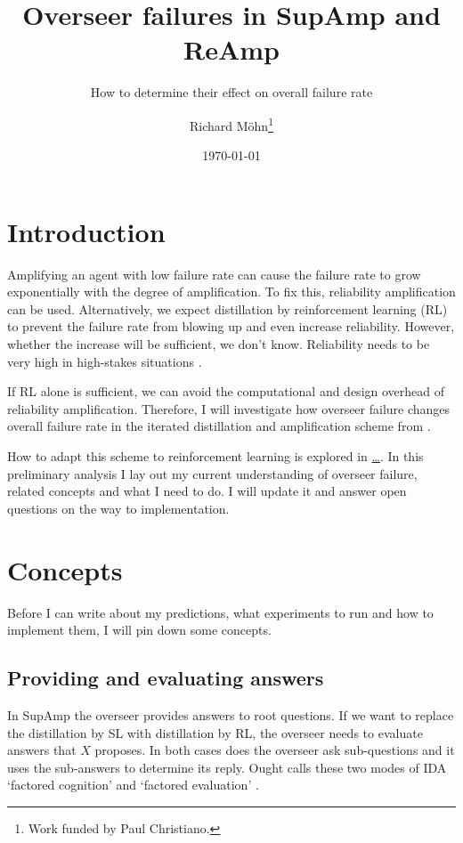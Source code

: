 \documentclass{farlamp}
\title{Overseer failures in SupAmp and ReAmp}
\subtitle{How to determine their effect on overall failure rate}
\author{Richard Möhn\thanks{Work funded by Paul Christiano.}}
\date{\today}
\begin{document}
\maketitle
\tableofcontents

\section{Introduction}

Amplifying an agent with low failure rate can cause the failure rate to grow
exponentially with the degree of amplification. To fix this, reliability
amplification can be used. Alternatively, we expect distillation by
reinforcement learning (RL) to prevent the failure rate from blowing up and even
increase reliability.
However, whether the increase will be sufficient, we don't know.
\parencite{ChriRelAmp} Reliability needs to be very high in high-stakes
situations \parencite[see][]{ChriLearCata}.

If RL alone is sufficient, we can avoid the computational and design overhead of
reliability amplification. Therefore, I will investigate how overseer failure
changes overall failure rate in the iterated distillation and amplification
scheme from \textcite{CSASupAmp}.

How to adapt this scheme to reinforcement learning is explored in \href{…}{…}.
In this preliminary analysis I lay out my current understanding of overseer
failure, related concepts and what I need to do. I will update it and answer
open questions on the way to implementation.


\section{Concepts}

Before I can write about my predictions, what experiments to run and how to
implement them, I will pin down some concepts.


\subsection{Providing and evaluating answers}

In SupAmp \parencite{CSASupAmp} the overseer provides answers to root questions.
If we want to replace the distillation by SL with distillation by RL, the
overseer needs to evaluate answers that $X$ proposes. In both cases does the
overseer ask sub-questions and it uses the sub-answers to determine its reply.
Ought calls these two modes of IDA \parencite[see][]{CotrIDA} ‘factored
cognition’ \parencite{StuhFacCog} and ‘factored evaluation’
\parencite{StuhDelCog}.
\end{document}
